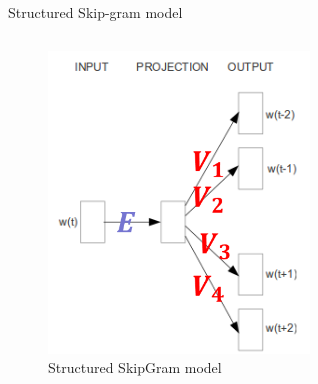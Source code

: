 \documentclass[12pt]{beamer}
\begin{document}
\begin{frame}{Structured Skip-gram model}
	
	\begin{columns}
		
		\begin{column}{4cm}
			\begin{figure}
				\includegraphics[width=\linewidth]{img/skipgram2.png}
				\caption{Structured SkipGram model}
			\end{figure}
		\end{column}
		
		\begin{column}{4cm}

		\end{column}
		
	\end{columns}
	
\end{frame}
\end{document}
